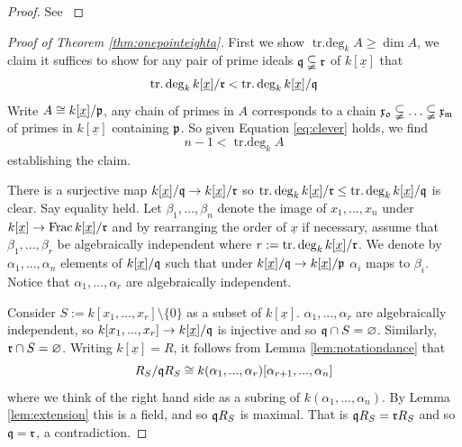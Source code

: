 \documentclass[12pt]{article}
\theoremstyle{plain}
\theoremstyle{definition}
\begin{document}
\begin{proof}
See \cite[\S 2.1]{com_alg_notes}
\end{proof}
\begin{proof}[Proof of Theorem \ref{thm:onepointeighta}]
First we show $\operatorname{tr.deg}_kA \geq \operatorname{dim}A$, we claim it suffices to show for any pair of prime ideals $\frak{q} \subsetneqq \frak{r}$ of $k[\underline{x}]$ that
\begin{equation}
    \label{eq:clever}
    \operatorname{tr.deg}_kk[\underline{x}]/\frak{r} < \operatorname{tr.deg}_kk[\underline{x}]/\frak{q}
\end{equation}
Write $A \cong k[\underline{x}]/\frak{p}$, any chain of primes in $A$ corresponds to a chain $\frak{x_0} \subsetneqq \hdots \subsetneqq \frak{x_m}$ of primes in $k[\underline{x}]$ containing $\frak{p}$. So given Equation \ref{eq:clever} holds, we find
\[n - 1 < \operatorname{tr.deg}_kA\]
establishing the claim.

There is a surjective map $k[\underline{x}]/\frak{q} \to k[\underline{x}]/\frak{r}$ so $\operatorname{tr.deg}_kk[\underline{x}]/\frak{r} \leq \operatorname{tr.deg}_kk[\underline{x}]/\frak{q}$ is clear. Say equality held. Let $\beta_1,...,\beta_n$ denote the image of $x_1,...,x_n$ under $k[\underline{x}] \to \operatorname{Frac}k[\underline{x}]/\frak{r}$ and by rearranging the order of $\underline{x}$ if necessary, assume that $\beta_1,...,\beta_r$ be algebraically independent where $r := \operatorname{tr.deg}_kk[\underline{x}]/\frak{r}$. We denote by $\alpha_1,...,\alpha_n$ elements of $k[\underline{x}]/\frak{q}$ such that under $k[\underline{x}]/\frak{q} \to k[\underline{x}]/\frak{p}$ $\alpha_i$ maps to $\beta_i$. Notice that $\alpha_1,...,\alpha_r$ are algebraically independent.

Consider $S := k[x_1,...,x_r]\setminus\lbrace 0 \rbrace$ as a subset of $k[\underline{x}]$. $\alpha_1,...,\alpha_r$ are algebraically independent, so $k[x_1,...,x_r] \to k[\underline{x}]/\frak{q}$ is injective and so $\frak{q} \cap S = \varnothing$. Similarly, $\frak{r} \cap S = \varnothing$. Writing $k[\underline{x}] = R$, it follows from Lemma \ref{lem:notationdance} that
\[R_S/\frak{q}R_S \cong k(\alpha_1,...,\alpha_r)[\alpha_{r+1},...,\alpha_n]\]
where we think of the right hand side as a subring of $k(\alpha_1,...,\alpha_n)$. By Lemma \ref{lem:extension} this is a field, and so $\frak{q}R_S$ is maximal. That is $\frak{q}R_S = \frak{r}R_S$ and so $\frak{q} = \frak{r}$, a contradiction.


\end{proof}
\end{document}
